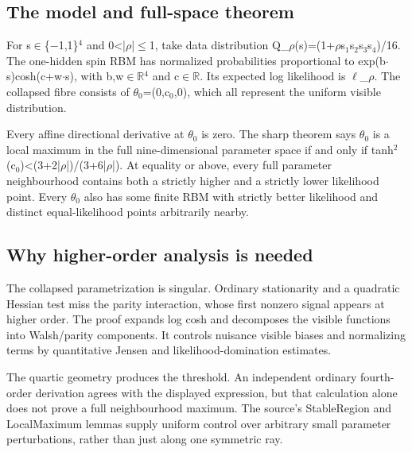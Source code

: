 \documentclass[11pt,a4paper]{article}
\begin{document}
\subsection{The model and full-space theorem}
For s\ensuremath{\in}\{\ensuremath{-}1,1\}\ensuremath{^4} and 0<|\ensuremath{\rho}|\ensuremath{\leq}1, take data distribution Q\_\ensuremath{\rho}(s)=(1+\ensuremath{\rho}s\ensuremath{_1}s\ensuremath{_2}s\ensuremath{_3}s\ensuremath{_4})/16. The one-hidden spin RBM has normalized probabilities proportional to exp(b\ensuremath{\cdot}s)cosh(c+w\ensuremath{\cdot}s), with b,w\ensuremath{\in}\ensuremath{\mathbb{R}}\ensuremath{^4} and c\ensuremath{\in}\ensuremath{\mathbb{R}}. Its expected log likelihood is \ensuremath{\ell}\_\ensuremath{\rho}. The collapsed fibre consists of \ensuremath{\theta}\ensuremath{_0}=(0,c\ensuremath{_0},0), which all represent the uniform visible distribution.

Every affine directional derivative at \ensuremath{\theta}\ensuremath{_0} is zero. The sharp theorem says \ensuremath{\theta}\ensuremath{_0} is a local maximum in the full nine-dimensional parameter space if and only if tanh\ensuremath{^2}(c\ensuremath{_0})<(3+2|\ensuremath{\rho}|)/(3+6|\ensuremath{\rho}|). At equality or above, every full parameter neighbourhood contains both a strictly higher and a strictly lower likelihood point. Every \ensuremath{\theta}\ensuremath{_0} also has some finite RBM with strictly better likelihood and distinct equal-likelihood points arbitrarily nearby.

\subsection{Why higher-order analysis is needed}
The collapsed parametrization is singular. Ordinary stationarity and a quadratic Hessian test miss the parity interaction, whose first nonzero signal appears at higher order. The proof expands log cosh and decomposes the visible functions into Walsh/parity components. It controls nuisance visible biases and normalizing terms by quantitative Jensen and likelihood-domination estimates.

The quartic geometry produces the threshold. An independent ordinary fourth-order derivation agrees with the displayed expression, but that calculation alone does not prove a full neighbourhood maximum. The source's StableRegion and LocalMaximum lemmas supply uniform control over arbitrary small parameter perturbations, rather than just along one symmetric ray.
\end{document}
